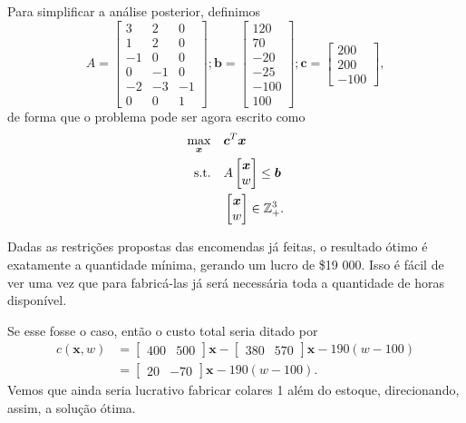 \documentclass[a4paper]{report}
\begin{document}
Para simplificar a análise posterior, definimos \[
A = \begin{bmatrix} 
    3 & 2 & 0 \\
    1 & 2 & 0 \\
    -1 & 0 & 0 \\
    0 & -1 & 0 \\
    -2 & -3 & -1 \\
    0 & 0 & 1
\end{bmatrix} ; \bm{b} = \begin{bmatrix} 
    120 \\ 70 \\ -20 \\ -25 \\ -100 \\ 100
\end{bmatrix} ; \bm{c} = \begin{bmatrix} 
200 \\ 200 \\ -100
\end{bmatrix} 
,\] de forma que o problema pode ser agora escrito como
\begin{align*}
    \max_{\bm{x}} \quad & \bm{c}^{T}\bm{x} \\
    \textrm{s.t.} \quad & A\begin{bmatrix} \bm{x} \\ w \end{bmatrix} \le \bm{b}  \\
      & \begin{bmatrix} \bm{x} \\ w \end{bmatrix} \in \mathbb{Z}^3_+
.\end{align*}

Dadas as restrições propostas das encomendas já feitas, o resultado ótimo é exatamente a quantidade mínima, gerando um lucro de \$19 000. Isso é fácil de ver uma vez que para fabricá-las já será necessária toda a quantidade de horas disponível.



Se esse fosse o caso, então o custo total seria ditado por
\begin{align*}
    c\left( \bm{x}, w \right) &= \begin{bmatrix} 400 & 500 \end{bmatrix} \bm{x} -\begin{bmatrix} 380 & 570 \end{bmatrix} \bm{x} - 190 \left( w-100 \right)  \\
    &= \begin{bmatrix} 20 & -70 \end{bmatrix} \bm{x} - 190\left( w-100 \right) 
.\end{align*}
Vemos que ainda seria lucrativo fabricar colares 1 além do estoque, direcionando, assim, a solução ótima.
\end{document}
